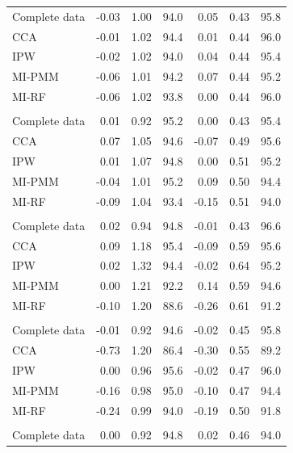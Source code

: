 \begin{longtable}{l|rrrrrr}
\midrule\addlinespace[2.5pt]
Complete data & -0.03 & 1.00 & 94.0 & 0.05 & 0.43 & 95.8 \\ 
CCA & -0.01 & 1.02 & 94.4 & 0.01 & 0.44 & 96.0 \\ 
IPW & -0.02 & 1.02 & 94.0 & 0.04 & 0.44 & 95.4 \\ 
MI-PMM & -0.06 & 1.01 & 94.2 & 0.07 & 0.44 & 95.2 \\ 
MI-RF & -0.06 & 1.02 & 93.8 & 0.00 & 0.44 & 96.0 \\ 
\midrule\addlinespace[2.5pt]
\multicolumn{7}{l}{MAR, 30\% missing} \\[2.5pt] 
\midrule\addlinespace[2.5pt]
Complete data & 0.01 & 0.92 & 95.2 & 0.00 & 0.43 & 95.4 \\ 
CCA & 0.07 & 1.05 & 94.6 & -0.07 & 0.49 & 95.6 \\ 
IPW & 0.01 & 1.07 & 94.8 & 0.00 & 0.51 & 95.2 \\ 
MI-PMM & -0.04 & 1.01 & 95.2 & 0.09 & 0.50 & 94.4 \\ 
MI-RF & -0.09 & 1.04 & 93.4 & -0.15 & 0.51 & 94.0 \\ 
\midrule\addlinespace[2.5pt]
\multicolumn{7}{l}{MAR, 50\% missing} \\[2.5pt] 
\midrule\addlinespace[2.5pt]
Complete data & 0.02 & 0.94 & 94.8 & -0.01 & 0.43 & 96.6 \\ 
CCA & 0.09 & 1.18 & 95.4 & -0.09 & 0.59 & 95.6 \\ 
IPW & 0.02 & 1.32 & 94.4 & -0.02 & 0.64 & 95.2 \\ 
MI-PMM & 0.00 & 1.21 & 92.2 & 0.14 & 0.59 & 94.6 \\ 
MI-RF & -0.10 & 1.20 & 88.6 & -0.26 & 0.61 & 91.2 \\ 
\midrule\addlinespace[2.5pt]
\multicolumn{7}{l}{MAR-strong, 10\% missing} \\[2.5pt] 
\midrule\addlinespace[2.5pt]
Complete data & -0.01 & 0.92 & 94.6 & -0.02 & 0.45 & 95.8 \\ 
CCA & -0.73 & 1.20 & 86.4 & -0.30 & 0.55 & 89.2 \\ 
IPW & 0.00 & 0.96 & 95.6 & -0.02 & 0.47 & 96.0 \\ 
MI-PMM & -0.16 & 0.98 & 95.0 & -0.10 & 0.47 & 94.4 \\ 
MI-RF & -0.24 & 0.99 & 94.0 & -0.19 & 0.50 & 91.8 \\ 
\midrule\addlinespace[2.5pt]
\multicolumn{7}{l}{MAR-strong, 30\% missing} \\[2.5pt] 
\midrule\addlinespace[2.5pt]
Complete data & 0.00 & 0.92 & 94.8 & 0.02 & 0.46 & 94.0 \\ 

\end{longtable}
